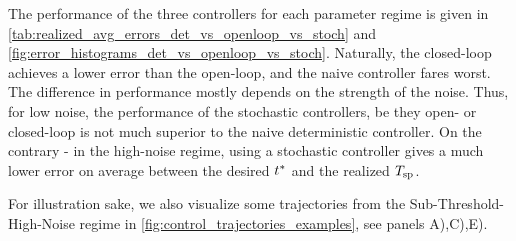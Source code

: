 \documentclass[12pt]{iopart}
\begin{document}
The performance of the three controllers for each parameter regime is given in
\cref{tab:realized_avg_errors_det_vs_openloop_vs_stoch} and
\cref{fig:error_histograms_det_vs_openloop_vs_stoch}. Naturally, the closed-loop
achieves a lower error than the open-loop, and the naive controller fares worst.
The difference in performance mostly depends on the strength of the noise. Thus,
for low noise, the performance of the stochastic controllers, be they open- or
closed-loop is not much superior to the naive deterministic controller. On the
contrary - in the high-noise regime, using a stochastic controller gives a much
lower error on average between the desired ${ t^* }$ and the realized ${ T_{\textrm{sp} } }$.

For illustration sake, we also visualize some trajectories from the
Sub-Threshold-High-Noise regime in \cref{fig:control_trajectories_examples},
see panels A),C),E).
 
\begin{table}[h]  
\begin{center}  
\\ 
\\
 \\ 
 \\
\caption{
Realized and theoretical performance of the different control laws. The
empirical performance is obtained using $N=10000$ sample paths. The theoretical
performance is found using the optimal value for $J$ for the open-loop
stochastic control and the value function $\v(x=0, t =0)$ for the closed-loop
stochastic control.}
\label{tab:realized_avg_errors_det_vs_openloop_vs_stoch} 
\end{center}
\end{table} 
\end{document}
